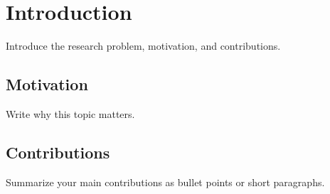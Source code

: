 \chapter{Introduction}

Introduce the research problem, motivation, and contributions.

\section{Motivation}
Write why this topic matters.

\section{Contributions}
Summarize your main contributions as bullet points or short paragraphs.

